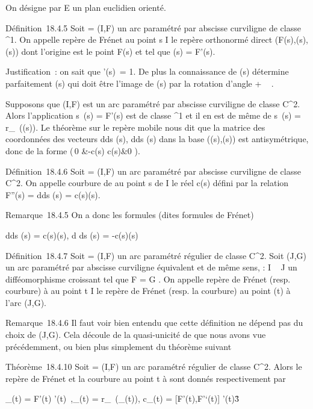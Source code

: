 \documentclass[]{article}
\begin{document}
On désigne par E un plan euclidien orienté.

Définition~18.4.5 Soit \Gamma = (I,F) un arc paramétré par abscisse
curviligne de classe ^1. On appelle repère de Frénet au
point s \in I le repère orthonormé direct
(F(s),\vect(s),\vecn(s)) dont
l'origine est le point F(s) et tel que \vect(s) =
F'(s).

Justification~: on sait que
\F'(s)\ = 1. De plus
la connaissance de \vect(s) détermine parfaitement
\vecn(s) qui doit être l'image de
\vect(s) par la rotation d'angle + \pi~
 .

Supposons que (I,F) est un arc paramétré par abscisse curviligne de
classe C^2. Alors l'application
s\mapsto~\vect(s) = F'(s) est de
classe ^1 et il en est de même de
s\mapsto~\vecn(s) =
r_\pi~(\vect(s)). Le théorème sur le repère
mobile nous dit que la matrice des coordonnées des vecteurs 
d\vect \over ds (s),
d\vecn \over ds (s) dans la base
(\vect(s),\vecn(s)) est
antisymétrique, donc de la forme \left
(\matrix\,0 &-c(s) \cr
c(s)&0 \right ).

Définition~18.4.6 Soit \Gamma = (I,F) un arc paramétré par abscisse
curviligne de classe C^2. On appelle courbure de \Gamma au point s
de I le réel c(s) défini par la relation F''(s) =
d\vect \over ds (s) =
c(s)\vecn(s).

Remarque~18.4.5 On a donc les formules (dites formules de Frénet)

 d\vect \over ds (s) =
c(s)\vecn(s), d\vecn
\over ds (s) = -c(s)\vect(s)

Définition~18.4.7 Soit \Gamma = (I,F) un arc paramétré régulier de classe
C^2. Soit (J,G) un arc paramétré par abscisse curviligne
équivalent et de même sens, \theta : I \rightarrow~ J un difféomorphisme croissant tel
que F = G \cdot \theta. On appelle repère de Frénet (resp. courbure) à \Gamma au point
t \in I le repère de Frénet (resp. la courbure) au point \theta(t) à l'arc
(J,G).

Remarque~18.4.6 Il faut voir bien entendu que cette définition ne dépend
pas du choix de (J,G). Cela découle de la quasi-unicité de \theta que nous
avons vue précédemment, ou bien plus simplement du théorème suivant

Théorème~18.4.10 Soit \Gamma = (I,F) un arc paramétré régulier de classe
C^2. Alors le repère de Frénet et la courbure au point t à \Gamma
sont donnés respectivement par

\vect_\Gamma(t) = F'(t) \over
\F'(t)\
,\quad \vecn_\Gamma(t) =
r_\pi~(\vect_\Gamma(t)),\quad
c_\Gamma(t) = {[}F'(t),F'`(t){]} \over
\F'(t)\^3
\end{document}
